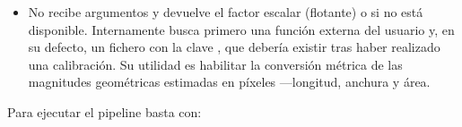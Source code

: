 \documentclass[a4paper,10pt,spanish]{jupyterBook}
\begin{document}
\begin{itemize}
\item {}
\sphinxAtStartPar
{} No recibe argumentos y devuelve el factor escalar  (flotante) o  si no está disponible. Internamente busca primero una función externa del usuario  y, en su defecto, un fichero  con la clave , que debería existir tras haber realizado una calibración. Su utilidad es habilitar la conversión métrica de las magnitudes geométricas estimadas en píxeles —longitud, anchura y área.

\end{itemize}

\sphinxAtStartPar
Para ejecutar el pipeline basta con:
\end{document}
